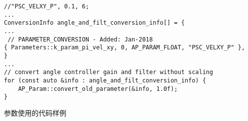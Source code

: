 \begin{listing}[ht]
\scriptsize{
\begin{verbatim}
//"PSC_VELXY_P", 0.1, 6;
...
ConversionInfo angle_and_filt_conversion_info[] = {
...
 // PARAMETER_CONVERSION - Added: Jan-2018
{ Parameters::k_param_pi_vel_xy, 0, AP_PARAM_FLOAT, "PSC_VELXY_P" },
}
...
// convert angle controller gain and filter without scaling
for (const auto &info : angle_and_filt_conversion_info) {
    AP_Param::convert_old_parameter(&info, 1.0f);
}
\end{verbatim}
}
\caption{参数使用的代码样例}
\label{lis:range_bug_code_example}
\end{listing}
